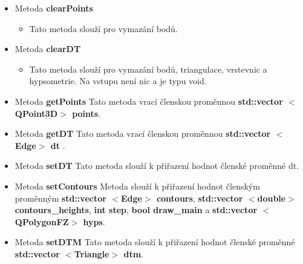 \documentclass[a4paper, 12pt]{article}
\begin{document}
\begin{itemize}
\begin{itemize}

\item Metoda \textbf{clearPoints}
		\begin{itemize}
			\item Tato metoda slouží pro vymazání bodů.
		\end{itemize}	

	\item Metoda \textbf{clearDT}
		\begin{itemize}
			\item Tato metoda slouží pro vymazání bodů, triangulace, vrstevnic a hypsometrie. Na vstupu není nic a je typu void.
		\end{itemize}	

	\item Metoda \textbf{getPoints}
Tato metoda vrací členskou proměnnou \textbf{std::vector $<$QPoint3D$>$ points}.


	\item Metoda \textbf{getDT}
Tato metoda vrací členskou proměnnou \textbf{std::vector $<$Edge$>$ dt }.
	\item Metoda \textbf{setDT}
Tato metoda slouží k přiřazení hodnot členské proměnné dt.

	\item Metoda \textbf{setContours}
Metoda slouží k přiřazení hodnot členským proměnným \textbf{std::vector $<$Edge$>$ contours}, \textbf{std::vector $<$double$>$ contours\_heights}, \textbf{int step}, \textbf{bool draw\_main} a \textbf{std::vector $<$QPolygonFZ$>$ hyps}.

\item Metoda \textbf{setDTM}
Tato metoda slouží k přiřazení hodnot členské proměnné \textbf{std::vector $<$Triangle$>$ dtm}.


\end{itemize}
\end{itemize}
\end{document}
